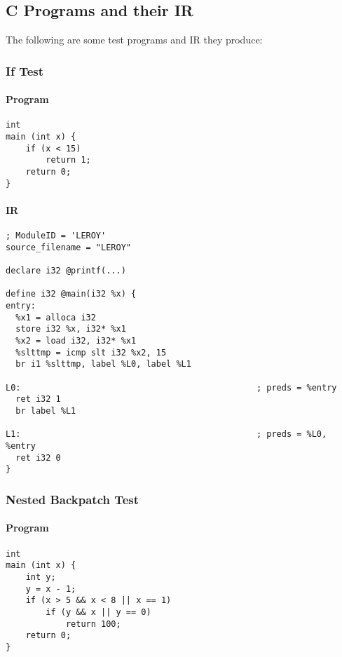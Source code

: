 \documentclass[12pt]{article}
\begin{document}
    \newpage
    \subsection{C Programs and their IR}
    The following are some test programs and IR they produce:

    \subsubsection{If Test}
    \paragraph{Program}
    \begin{verbatim}
int
main (int x) {
    if (x < 15)
        return 1;
    return 0;
}
    \end{verbatim}

    \paragraph{IR}
    \begin{verbatim}
; ModuleID = 'LEROY'
source_filename = "LEROY"

declare i32 @printf(...)

define i32 @main(i32 %x) {
entry:
  %x1 = alloca i32
  store i32 %x, i32* %x1
  %x2 = load i32, i32* %x1
  %slttmp = icmp slt i32 %x2, 15
  br i1 %slttmp, label %L0, label %L1

L0:                                               ; preds = %entry
  ret i32 1
  br label %L1

L1:                                               ; preds = %L0, %entry
  ret i32 0
}
    \end{verbatim}

    \newpage
    \subsubsection{Nested Backpatch Test}
    \paragraph{Program}
    \begin{verbatim}
int
main (int x) {
    int y;
    y = x - 1;
    if (x > 5 && x < 8 || x == 1)
        if (y && x || y == 0)
            return 100;
    return 0;
}
    \end{verbatim}
\end{document}
